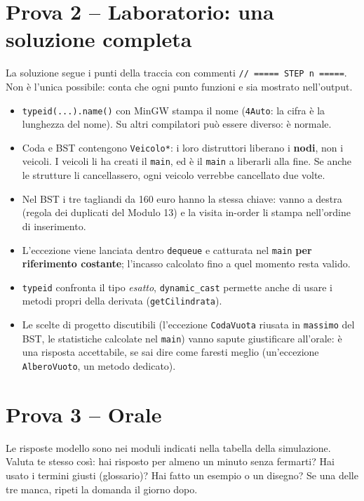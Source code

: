 \section*{Prova 2 -- Laboratorio: una soluzione completa}

La soluzione segue i punti della traccia con commenti \texttt{// ===== STEP n =====}. Non
è l'unica possibile: conta che ogni punto funzioni e sia mostrato nell'output.

\begin{consiglio}
\begin{itemize}
  \item \texttt{typeid(...).name()} con MinGW stampa il nome  (\texttt{4Auto}:
        la cifra è la lunghezza del nome). Su altri compilatori può essere diverso: è
        normale.
  \item Coda e BST contengono \texttt{Veicolo*}: i loro distruttori liberano i
        \textbf{nodi}, non i veicoli. I veicoli li ha creati il \texttt{main}, ed è il
        \texttt{main} a liberarli alla fine. Se anche le strutture li cancellassero, ogni
        veicolo verrebbe cancellato due volte.
  \item Nel BST i tre tagliandi da 160 euro hanno la stessa chiave: vanno a destra (regola
        dei duplicati del Modulo 13) e la visita in-order li stampa nell'ordine di
        inserimento.
  \item L'eccezione viene lanciata dentro \texttt{dequeue} e catturata nel \texttt{main}
        \textbf{per riferimento costante}; l'incasso calcolato fino a quel momento resta
        valido.
  \item \texttt{typeid} confronta il tipo \emph{esatto}, \texttt{dynamic\_cast} permette
        anche di usare i metodi propri della derivata (\texttt{getCilindrata}).
  \item Le scelte di progetto discutibili (l'eccezione \texttt{CodaVuota} riusata in
        \texttt{massimo} del BST, le statistiche calcolate nel \texttt{main}) vanno sapute
        giustificare all'orale:  è una risposta accettabile, se sai dire
        come faresti meglio (un'eccezione \texttt{AlberoVuoto}, un metodo dedicato).
\end{itemize}
\end{consiglio}

\section*{Prova 3 -- Orale}

Le risposte modello sono nei moduli indicati nella tabella della simulazione. Valuta te
stesso così: hai risposto per almeno un minuto senza fermarti? Hai usato i termini
giusti (glossario)? Hai fatto un esempio o un disegno? Se una delle tre manca, ripeti la
domanda il giorno dopo.
